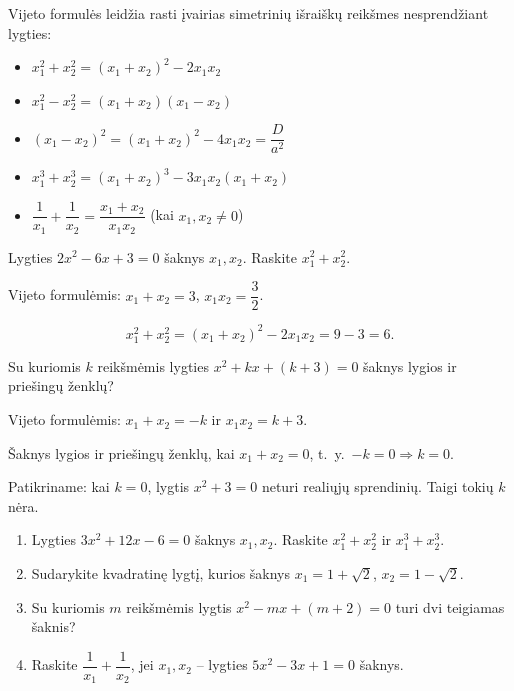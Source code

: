 Vijeto formulės leidžia rasti įvairias simetrinių išraiškų reikšmes nesprendžiant lygties:

\begin{itemize}
    \item $x_1^2 + x_2^2 = (x_1 + x_2)^2 - 2x_1 x_2$
    \item $x_1^2 - x_2^2 = (x_1 + x_2)(x_1 - x_2)$
    \item $(x_1 - x_2)^2 = (x_1 + x_2)^2 - 4x_1 x_2 = \dfrac{D}{a^2}$
    \item $x_1^3 + x_2^3 = (x_1 + x_2)^3 - 3x_1 x_2(x_1 + x_2)$
    \item $\dfrac{1}{x_1} + \dfrac{1}{x_2} = \dfrac{x_1 + x_2}{x_1 x_2}$ \quad (kai $x_1, x_2 \neq 0$)
\end{itemize}

\begin{example}
Lygties $2x^2 - 6x + 3 = 0$ šaknys $x_1, x_2$. Raskite $x_1^2 + x_2^2$.

Vijeto formulėmis: $x_1 + x_2 = 3$, $x_1 x_2 = \dfrac{3}{2}$.

\[
x_1^2 + x_2^2 = (x_1 + x_2)^2 - 2x_1 x_2 = 9 - 3 = 6.
\]
\end{example}

\begin{example}
Su kuriomis $k$ reikšmėmis lygties $x^2 + kx + (k+3) = 0$ šaknys lygios ir priešingų ženklų?

Vijeto formulėmis: $x_1 + x_2 = -k$ ir $x_1 x_2 = k + 3$.

Šaknys lygios ir priešingų ženklų, kai $x_1 + x_2 = 0$, t.~y.\ $-k = 0 \Rightarrow k = 0$.

Patikriname: kai $k = 0$, lygtis $x^2 + 3 = 0$ neturi realiųjų sprendinių. Taigi tokių $k$ nėra.
\end{example}

\begin{exercise}
\begin{enumerate}[label=\alph*)]
    \item Lygties $3x^2 + 12x - 6 = 0$ šaknys $x_1, x_2$. Raskite $x_1^2 + x_2^2$ ir $x_1^3 + x_2^3$.
    \item Sudarykite kvadratinę lygtį, kurios šaknys $x_1 = 1 + \sqrt{2}$, $x_2 = 1 - \sqrt{2}$.
    \item Su kuriomis $m$ reikšmėmis lygtis $x^2 - mx + (m+2) = 0$ turi dvi teigiamas šaknis?
    \item Raskite $\dfrac{1}{x_1} + \dfrac{1}{x_2}$, jei $x_1, x_2$ – lygties $5x^2 - 3x + 1 = 0$ šaknys.
\end{enumerate}
\end{exercise}

